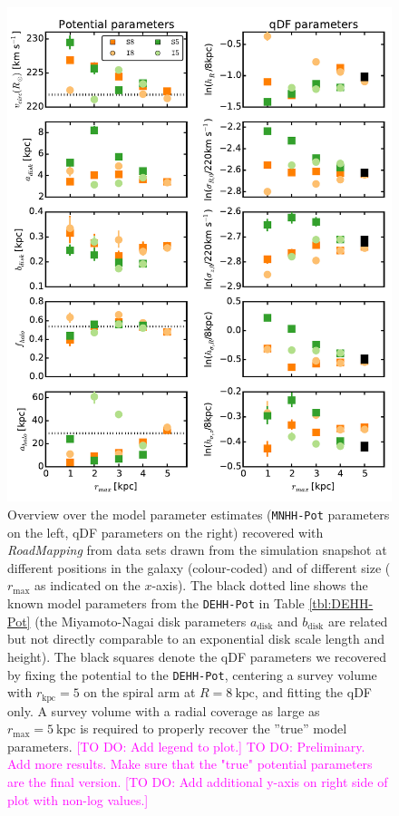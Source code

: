 \documentclass[iop,revtex4,numberedappendix,appendixfloats]{emulateapj}
\newcommand{\RM}{{\sl RoadMapping}}
\newcommand{\Wilma}[1]{\textcolor{Magenta}{#1}}
\begin{document}
\begin{figure}[!htbp]
\centering
\includegraphics[width=\columnwidth]{fig/MNdHHdiffSph2_violins.pdf}
\caption{Overview over the model parameter estimates (\texttt{MNHH-Pot} parameters on the left, qDF parameters on the right) recovered with \RM{} from data sets drawn from the simulation snapshot at different positions in the galaxy (colour-coded) and of different size ($r_\text{max}$ as indicated on the $x$-axis). The black dotted line shows the known model parameters from the \texttt{DEHH-Pot} in Table \ref{tbl:DEHH-Pot} (the Miyamoto-Nagai disk parameters $a_\text{disk}$ and $b_\text{disk}$ are related but not directly comparable to an exponential disk scale length and height). The black squares denote the qDF parameters we recovered by fixing the potential to the \texttt{DEHH-Pot}, centering a survey volume with $r_\text{kpc}=5$ on the spiral arm at $R=8~\text{kpc}$, and fitting the qDF only. A survey volume with a radial coverage as large as $r_\text{max}=5~\text{kpc}$ is required to properly recover the ''true'' model parameters. \Wilma{[TO DO: Add legend to plot.]} \Wilma{TO DO: Preliminary. Add more results. Make sure that the "true" potential parameters are the final version.} \Wilma{[TO DO: Add additional y-axis on right side of plot with non-log values.]}}
\label{fig:model_parameters}
\end{figure}
\end{document}
